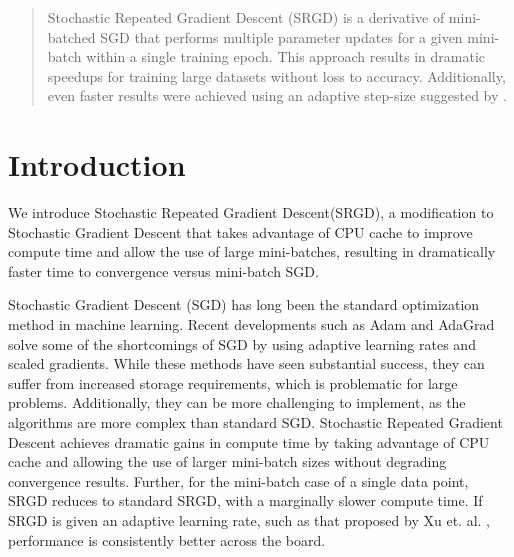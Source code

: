 \documentclass[,conference,compsoc]{IEEEtran}
\begin{document}
\maketitle

\begin{abstract}
    Stochastic Repeated Gradient Descent (SRGD) is a derivative of mini-batched
    SGD that performs multiple parameter updates for a given mini-batch within a
    single training epoch. This approach results in dramatic speedups for
    training large datasets without loss to accuracy. Additionally, even faster
    results were achieved using an adaptive step-size suggested by \cite{bib:xu-assgd}.
\end{abstract}





%



\section{Introduction}
We introduce Stochastic Repeated Gradient Descent(SRGD), a modification to
Stochastic Gradient Descent that takes advantage of CPU cache to improve compute
time and allow the use of large mini-batches, resulting in dramatically faster
time to convergence versus mini-batch SGD. 

Stochastic Gradient Descent (SGD) has long been the standard optimization method
in machine learning. Recent developments such as Adam and AdaGrad solve some of
the shortcomings of SGD by using adaptive learning rates and scaled gradients.
While these methods have seen substantial success, they can suffer from increased
storage requirements, which is problematic for large problems. Additionally,
they can be more challenging to implement, as the algorithms are more complex
than standard SGD. Stochastic Repeated Gradient Descent achieves dramatic gains
in compute time by taking advantage of CPU cache and allowing the use of larger
mini-batch sizes without degrading convergence results. Further, for the
mini-batch case of a single data point, SRGD reduces to standard SRGD, with a
marginally slower compute time. If SRGD is given an adaptive learning rate, such
as that proposed by Xu et. al. \cite{bib:xu-assgd}, performance is consistently better
across the board.
\end{document}

